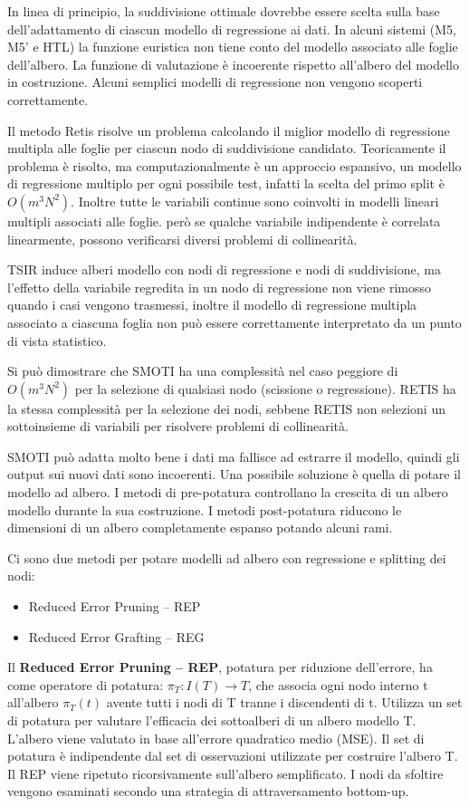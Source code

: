 \documentclass[a4paper]{extarticle}
\begin{document}
In linea di principio, la suddivisione ottimale dovrebbe essere scelta sulla base dell’adattamento di ciascun modello di regressione ai dati. In alcuni sistemi (M5, M5’ e HTL) la funzione euristica non tiene conto del modello associato alle foglie dell’albero. La funzione di valutazione è incoerente rispetto all'albero del modello in costruzione. Alcuni semplici modelli di regressione non vengono scoperti correttamente.

Il metodo Retis risolve un problema calcolando il miglior modello di regressione multipla alle foglie per ciascun nodo di suddivisione candidato. Teoricamente il problema è risolto, ma computazionalmente è un approccio espansivo, un modello di regressione multiplo per ogni possibile test, infatti la scelta del primo split è $O(m^3N^2)$. Inoltre tutte le variabili continue sono coinvolti in modelli lineari multipli associati alle foglie. però se qualche variabile indipendente è correlata linearmente, possono verificarsi diversi problemi di collinearità.

TSIR induce alberi modello con nodi di regressione e nodi di suddivisione, ma l'effetto della variabile regredita in un nodo di regressione non viene rimosso quando i casi vengono trasmessi, inoltre il modello di regressione multipla associato a ciascuna foglia non può essere correttamente interpretato da un punto di vista statistico.

Si può dimostrare che SMOTI ha una complessità nel caso peggiore di $O(m^3N^2)$ per la selezione di qualsiasi nodo (scissione o regressione). RETIS ha la stessa complessità per la selezione dei nodi, sebbene RETIS non selezioni un sottoinsieme di variabili per risolvere problemi di collinearità.

SMOTI può adatta molto bene i dati ma fallisce ad estrarre il modello, quindi gli output sui nuovi dati sono incoerenti. Una possibile soluzione è quella di potare il modello ad albero. I metodi di pre-potatura controllano la crescita di un albero modello durante la sua costruzione. I metodi post-potatura riducono le dimensioni di un albero completamente espanso potando alcuni rami.

Ci sono due metodi per potare modelli ad albero con regressione e splitting dei nodi:
\begin{itemize}
\item Reduced Error Pruning – REP
\item Reduced Error Grafting – REG
\end{itemize}

Il \textbf{ Reduced Error Pruning – REP}, potatura per riduzione dell'errore, ha come operatore di potatura: $\pi_T: I(T) \rightarrow T$, che associa ogni nodo interno t all'albero $\pi_T(t)$ avente tutti i nodi di T tranne i discendenti di t. Utilizza un set di potatura per valutare l'efficacia dei sottoalberi di un albero modello T. L'albero viene valutato in base all'errore quadratico medio (MSE). Il set di potatura è indipendente dal set di osservazioni utilizzate per costruire l’albero T. Il REP viene ripetuto ricorsivamente sull'albero semplificato. I nodi da sfoltire vengono esaminati secondo una strategia di attraversamento bottom-up.
\end{document}
